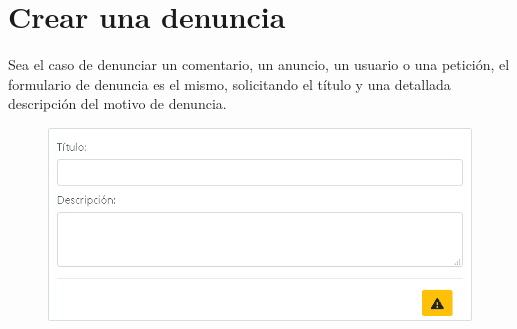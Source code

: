 \section{Crear una denuncia}
Sea el caso de denunciar un comentario, un anuncio, un usuario o una petici\'{o}n, el formulario de denuncia es el mismo, solicitando el t\'{i}tulo y una detallada descripci\'{o}n del motivo de denuncia. 

\begin{figure}[h!]
\centering
\includegraphics[width=.6\textwidth]{Img/ManualUsuario/DENUNCIA.png}
\end{figure}




